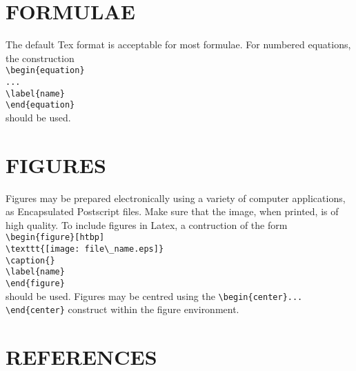 \documentclass{article}
\begin{document}
\section*{FORMULAE}

The default Tex format is acceptable for most formulae.
For numbered equations, the construction \\
\verb|\begin{equation}|\\ 
\verb|...|\\
\verb|\label{name}|\\
\verb|\end{equation}|\\
should be used.

\section*{FIGURES}

Figures may be prepared electronically using a variety of
computer applications, as Encapsulated Postscript files.
Make sure that the image, when printed, is of high quality.
To include figures in Latex, a contruction of the form\\
\verb|\begin{figure}[htbp]|\\
\verb|\texttt{[image: file\_name.eps]}|\\
\verb|\caption{}|\\
\verb|\label{name}|\\
\verb|\end{figure}|\\
should be used.
Figures may be centred
using the \verb|\begin{center}... \end{center}| construct
within the figure environment.

\section*{REFERENCES}

\begin{thebibliography}{99}


\end{thebibliography}
\end{document}
